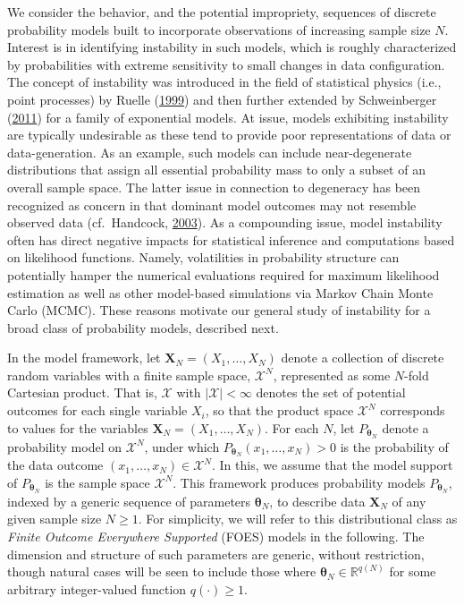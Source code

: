 \documentclass[12pt]{article}
\theoremstyle{definition}
\begin{document}
We consider the behavior, and the potential impropriety, sequences of discrete probability models built to incorporate observations of increasing sample size $N$.  Interest is in identifying  instability in such models, which is roughly characterized by probabilities with extreme sensitivity to small changes in data configuration.  The concept of instability was introduced in the field of statistical physics (i.e., point processes) by Ruelle (\protect\hyperlink{ref-ruelle1999statistical}{1999}) and then further extended by Schweinberger
(\protect\hyperlink{ref-schweinberger2011instability}{2011})   for a family of exponential  models.
At issue, models exhibiting instability are typically undesirable  as these tend to provide poor representations of data or data-generation.
 As an example, such models  can include near-degenerate distributions that assign all essential probability mass to only a subset of
 an overall sample space.     The latter issue in connection to degeneracy has been recognized as concern  in that dominant model outcomes  may not resemble   observed data  (cf.~Handcock, \hyperlink{ref-handcock2003assessing}{2003}).  As a compounding issue, model instability often has direct negative impacts for statistical inference and computations based on likelihood functions.     Namely, volatilities  in probability structure  can potentially
  hamper the numerical evaluations required for maximum likelihood estimation as well as other model-based simulations via Markov Chain Monte Carlo (MCMC).
  These reasons motivate our general study of instability for a broad class of probability models, described next.

    In the model framework,
 let $  \boldsymbol X_N =(X_1, \dots, X_N)$ denote a collection of discrete random variables with a finite sample space, $\mathcal{X}^N$, represented as some $N$-fold Cartesian  product. That is, $\mathcal{X}$ with $|\mathcal{X}| < \infty$ denotes the set of potential outcomes for each single variable $X_i$, so that the product space $\mathcal{X}^N$ corresponds to values for the variables  $\boldsymbol X_N=(X_1,\ldots,X_N)$. For each $N$, let $P_{\boldsymbol \theta_N}$ denote a probability model on $\mathcal{X}^N$, under which $P_{\boldsymbol \theta_N}(x_1, \dots, x_N) > 0$ is the probability of the data outcome $(x_1, \dots, x_N) \in \mathcal{X}^N$. In this, we assume that the model support of $P_{\boldsymbol \theta_N}$ is the sample space $\mathcal{X}^N$. This framework produces probability models $P_{\boldsymbol \theta_N}$, indexed by a generic sequence of parameters $\boldsymbol \theta_N$, to describe data $\boldsymbol X_N$ of any given sample size $N \geq 1$. For simplicity, we will refer to this distributional class as {\it Finite Outcome Everywhere Supported} (FOES) models in the following.  The dimension and structure of such parameters are generic, without restriction, though natural cases will be seen to include those where $\boldsymbol \theta_N \in \mathbb{R}^{q(N)}$ for some arbitrary integer-valued function $q(\cdot) \geq 1$.
\end{document}
